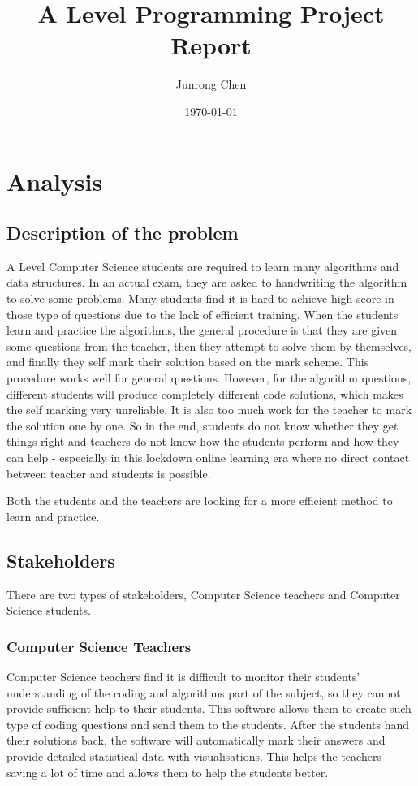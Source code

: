 \documentclass{report}
\title{A Level Programming Project Report}
\author{Junrong Chen}
\date{\today}
\begin{document}
\maketitle
\tableofcontents
\clearpage
\chapter{Analysis}

\section{Description of the problem}

A Level Computer Science students are required to learn many algorithms and data structures. In an actual exam, they are asked to handwriting the algorithm to solve some problems. Many students find it is hard to achieve high score in those type of questions due to the lack of efficient training. When the students learn and practice the algorithms, the general procedure is that they are given some questions from the teacher, then they attempt to solve them by themselves, and finally they self mark their solution based on the mark scheme. This procedure works well for general questions. However, for the algorithm questions, different students will produce completely different code solutions, which makes the self marking very unreliable. It is also too much work for the teacher to mark the solution one by one. So in the end, students do not know whether they get things right and teachers do not know how the students perform and how they can help - especially in this lockdown online learning era where no direct contact between teacher and students is possible.

Both the students and the teachers are looking for a more efficient method to learn and practice.

\section{Stakeholders}

There are two types of stakeholders, Computer Science teachers and Computer Science students.

\subsection{Computer Science Teachers}

Computer Science teachers find it is difficult to monitor their students' understanding of the coding and algorithms part of the subject, so they cannot provide sufficient help to their students. This software allows them to create such type of coding questions and send them to the students. After the students hand their solutions back, the software will automatically mark their answers and provide detailed statistical data with visualisations. This helps the teachers saving a lot of time and allows them to help the students better.
\end{document}
